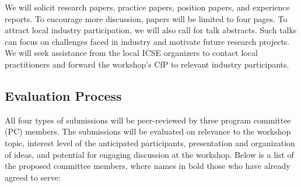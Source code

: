 \documentclass[10pt, conference]{IEEEtran}
\begin{document}
We will solicit research papers, practice papers, position papers, and experience reports. To encourage more discussion, papers will be limited to four pages. To attract local industry participation, we will also call for talk abstracts. Such talks can focus on challenges faced in industry and motivate future research projects. We will seek assistance from the local ICSE organizers to contact local practitioners and forward the workshop's CfP to relevant industry participants.

\subsection{Evaluation Process}

All four types of submissions will be peer-reviewed by three program committee (PC) members. The submissions will be evaluated on relevance to the workshop topic, interest level of the anticipated participants, presentation and organization of ideas, and potential for engaging discussion at the workshop. Below is a list of the proposed committee members, where names in bold those who have already agreed to serve:
\end{document}
